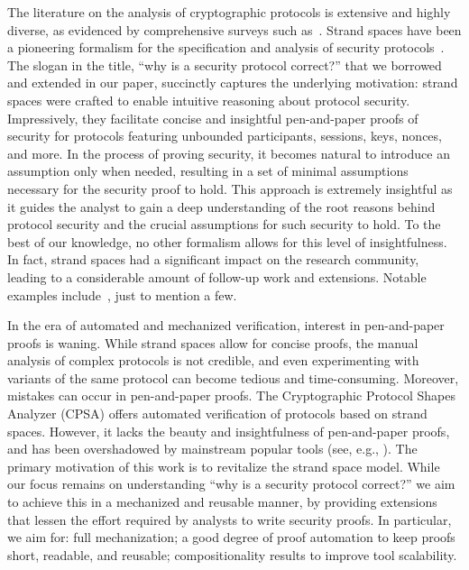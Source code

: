 
The literature on the analysis of cryptographic protocols is extensive and highly diverse, as evidenced by comprehensive surveys such as~\cite{barbosa:SoKCAC,blanchetPOST2012,CortierSurvey2011}.
Strand spaces have been a pioneering formalism for the specification and analysis of security protocols~\cite{FHG98}.
The slogan in the title, ``why is a security protocol correct?'' that we borrowed and extended in our paper, succinctly captures the underlying motivation: strand spaces were crafted to enable intuitive reasoning about protocol security.
Impressively, they facilitate concise and insightful pen-and-paper proofs of security for protocols featuring unbounded participants, sessions, keys, nonces, and more.
In the process of proving security, it becomes natural to introduce an assumption only when needed, resulting in a set of minimal assumptions necessary for the security proof to hold.
This approach is extremely insightful as it guides the analyst to gain a deep understanding of the root reasons behind protocol security and the crucial assumptions for such security to hold.
To the best of our knowledge, no other formalism allows for this level of insightfulness.
In fact, strand spaces had a significant impact on the research community, leading to a considerable amount of follow-up work and extensions.
Notable examples include~\cite{CVB05,CDLMS03,HP03,KL09,YEMMS16}, just to mention a few.





In the era of automated and mechanized verification, interest in pen-and-paper proofs is waning.
While strand spaces allow for concise proofs, the manual analysis of complex protocols is not credible, and even experimenting with variants of the same protocol can become tedious and time-consuming.
Moreover, mistakes can occur in pen-and-paper proofs.
The Cryptographic Protocol Shapes Analyzer (CPSA) \cite{cpsa,LRGR16} offers automated verification of protocols based on strand spaces.
However, it lacks the beauty and insightfulness of pen-and-paper proofs, and has been overshadowed by mainstream popular tools (see, e.g., \cite{BSCS20,EMM09,MSCB13}).
The primary motivation of this work is to revitalize the strand space model.
While our focus remains on understanding ``why is a security protocol correct?'' we aim to achieve this in a mechanized and reusable manner, by providing extensions that lessen the effort required by analysts to write security proofs.
In particular, we aim for: full mechanization; a good degree of proof automation to keep proofs short, readable, and reusable;
compositionality results to improve tool scalability.

